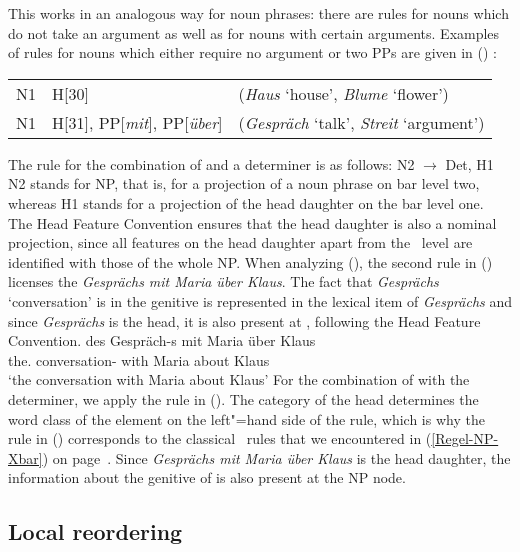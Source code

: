 This works in an analogous way for noun phrases: there are rules for nouns which do not take an argument as well as for nouns with certain arguments. Examples of rules for 
nouns which either require no argument or two PPs are given in () \citep*[]{GKPS85a}:
\ea
\begin{tabular}[t]{@{}l@{~$\to$~}ll@{}}
N1 & H[30] & (\emph{Haus} `house', \emph{Blume} `flower')\\
N1 & H[31], PP[\emph{mit}], PP[\emph{über}] & (\emph{Gespräch} `talk', \emph{Streit} `argument')\\
\end{tabular}
\z
The rule for the combination of \nbar and a determiner is as follows:
\ea
N2 $\to$ Det, H1
\z
N2 stands for NP, that is, for a projection of a noun phrase on bar level two, whereas H1
stands for a projection of the head daughter on the bar level one.
The Head Feature Convention ensures that the head daughter is also a nominal projection, since all features on the head daughter apart from the \xbar~level 
are identified with those of the whole NP. When analyzing (), the second rule in () licenses the \nbar \emph{Gesprächs mit Maria
  über Klaus}. The fact that \emph{Gesprächs} `conversation' is in the genitive is represented in the lexical item of \emph{Gesprächs} and since \emph{Gesprächs}
  is the head, it is also present at \nbar, following the Head Feature Convention.
\ea
\gll des Gespräch-s mit Maria über Klaus\\
	 the.\gen{} conversation-\gen{} with Maria about Klaus\\
\glt `the conversation with Maria about Klaus'
\z
For the combination of \nbar with the determiner, we apply the rule in (). The category of
the head determines the word class of the element on the left"=hand side of the rule, which is why
the rule in () corresponds to the classical \xbar~rules that we encountered in (\ref{Regel-NP-Xbar}) on page~\pageref{Regel-NP-Xbar}. Since \emph{Gesprächs mit Maria über Klaus} is
the head daughter, the information about the genitive of \nbar is also present at the NP node.

\subsection{Local reordering}
\label{GPSG-lokale-Umstellung}

